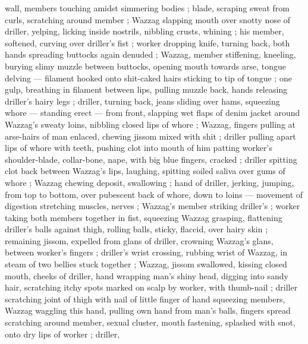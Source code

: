 wall, members touching amidst simmering bodies ; blade, scraping sweat from curls, scratching around member ; Wazzag slapping mouth over snotty nose of driller, yelping, licking inside nostrils, nibbling crusts, whining ; his member, softened, curving over driller's fist ; worker dropping knife, turning back, both hands spreading buttocks again denuded ; Wazzag, member stiffening, kneeling, burying slimy muzzle between buttocks, opening mouth towards arse, tongue delving --- filament hooked onto shit-caked hairs sticking to tip of tongue ; one gulp, breathing in filament between lips, pulling muzzle back, hands releasing driller's hairy legs ; driller, turning back, jeans sliding over hams, squeezing whore --- standing erect --- from front, slapping wet flaps of denim jacket around Wazzag's sweaty loins, nibbling closed lips of whore ; Wazzag, fingers pulling at arse-hairs of man enlaced, chewing jissom mixed with shit ; driller pulling apart lips of whore with teeth, pushing clot into mouth of him patting worker's shoulder-blade, collar-bone, nape, with big blue fingers, cracked ; driller spitting clot back between Wazzag's lips, laughing, spitting soiled saliva over gums of whore ; Wazzag chewing deposit, swallowing ; hand of driller, jerking, jumping, from top to bottom, over pubescent back of whore, down to loins --- movement of digestion stretching muscles, nerves ; Wazzag's member striking driller's ; worker taking both members together in fist, squeezing {\col} Wazzag grasping, flattening driller's balls against thigh, rolling balls, sticky, flaccid, over hairy skin ; remaining jissom, expelled from glans of driller, crowning Wazzag's glans, between worker's fingers ; driller's wrist crossing, rubbing wrist of Wazzag, in steam of two bellies stuck together ; Wazzag, jissom swallowed, kissing closed mouth, cheeks of driller, hand wrapping man's shiny head, digging into sandy hair, scratching itchy spots marked on scalp by worker, with thumb-nail ; driller scratching joint of thigh with nail of little finger of hand squeezing members, Wazzag waggling this hand, pulling own hand from man's balls, fingers spread scratching around member, sexual cluster, mouth fastening, splashed with snot, onto dry lips of worker ; driller, 
